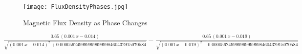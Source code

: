 \begin{figure}[H]
	\begin{center}
		\texttt{[image: FluxDensityPhases.jpg]}
		\caption{Magnetic Flux Density as Phase Changes}
		\label{fig:fluxD0}
	\end{center}
\end{figure}


$\frac{0.65\,{\left(0.001\,x-0.014\right)}}{\sqrt{{{\left(0.001\,x-0.014\right)}}^2 +0.000056249999999999998460432915070584}}-\frac{0.65\,{\left(0.001\,x-0.019\right)}}{\sqrt{{{\left(0.001\,x-0.019\right)}}^2 +0.000056249999999999998460432915070584}}$

\color{black}
